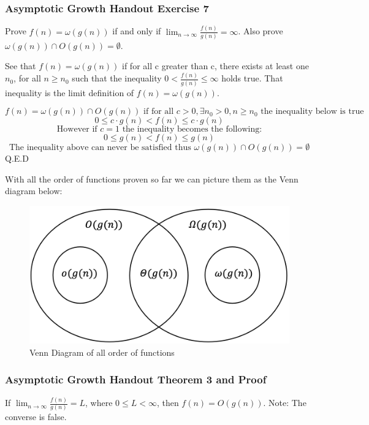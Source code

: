 \documentclass{article}
\begin{document}
\subsubsection{Asymptotic Growth Handout Exercise 7}
Prove $f(n) = \omega(g(n))$ if and only if $\lim_{n \rightarrow \infty} \frac{f(n)}{g(n)} = \infty $. Also prove $\omega(g(n)) \cap O(g(n)) = \emptyset$.

See that $f(n) = \omega(g(n))$ if for all c greater than c, there exists at least one $n_0$, for all $n \geq n_0$ such that the inequality $0 < \frac{f(n)}{g(n)} \leq \infty $ holds true. That inequality is the limit definition of $f(n) = \omega(g(n))$.

$$f(n) = \omega(g(n)) \cap O(g(n)) \text{ if for all } c > 0, \exists n_0 > 0, n \geq n_0 \text{ the inequality below is true }$$
$$0 \leq c \cdot g(n) < f(n) \leq c \cdot g(n)$$
$$\text{However if } c = 1 \text{ the inequality becomes the following:}$$
$$0 \leq g(n) < f(n)  \leq g(n)$$
$$\text{The inequality above can never be satisfied thus } \omega(g(n)) \cap O(g(n)) = \emptyset$$
Q.E.D

With all the order of functions proven so far we can picture them as the Venn diagram below:

\begin{figure}[H]
    \centering
    \includegraphics[scale=.4]{Figures/cse102lecture3example1.png}
    \caption{Venn Diagram of all order of functions}
    \label{lecture3example1}
\end{figure}

\subsubsection{Asymptotic Growth Handout Theorem 3 and Proof}
If $\lim_{n \rightarrow \infty} \frac{f(n)}{g(n)} = L$, where $0 \leq L < \infty$, then $f(n) = O(g(n))$. Note: The converse is false.
\end{document}
